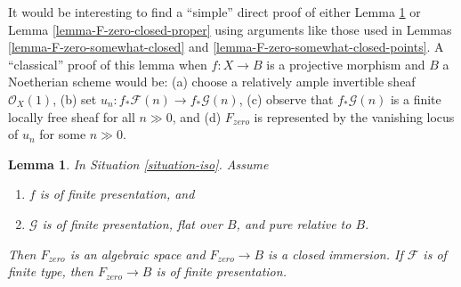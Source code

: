 \documentclass{stacks-project}
\theoremstyle{plain}
\newtheorem{lemma}[subsection]{Lemma}
\theoremstyle{definition}
\theoremstyle{remark}
\numberwithin{equation}{subsection}
\begin{document}
\noindent
It would be interesting to find a ``simple'' direct proof of either
Lemma \ref{lemma-F-zero-closed-pure} or
Lemma \ref{lemma-F-zero-closed-proper}
using arguments like those used in
Lemmas \ref{lemma-F-zero-somewhat-closed} and
\ref{lemma-F-zero-somewhat-closed-points}.
A ``classical'' proof of this lemma when $f : X \to B$ is a projective
morphism and $B$ a Noetherian scheme would be: (a) choose a relatively ample
invertible sheaf $\mathcal{O}_X(1)$, (b) set
$u_n : f_*\mathcal{F}(n) \to f_*\mathcal{G}(n)$,
(c) observe that $f_*\mathcal{G}(n)$ is a finite locally free sheaf
for all $n \gg 0$, and (d) $F_{zero}$ is represented by the vanishing
locus of $u_n$ for some $n \gg 0$.

\begin{lemma}
\label{lemma-F-zero-closed-pure}
In Situation \ref{situation-iso}. Assume
\begin{enumerate}
\item $f$ is of finite presentation, and
\item $\mathcal{G}$ is of finite presentation,
flat over $B$, and pure relative to $B$.
\end{enumerate}
Then $F_{zero}$ is an algebraic space and $F_{zero} \to B$
is a closed immersion. If $\mathcal{F}$ is of finite type, then
$F_{zero} \to B$ is of finite presentation.
\end{lemma}
\end{document}
